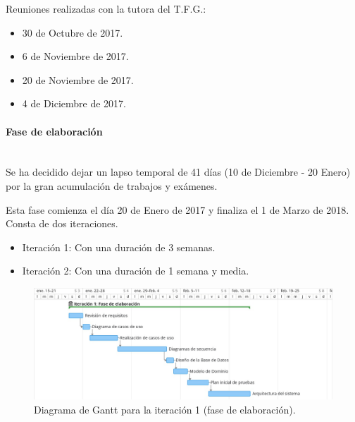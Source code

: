 \documentclass[twoside]{report}
\begin{document}
Reuniones realizadas con la tutora del T.F.G.:

\begin{itemize}
\item 30 de Octubre de 2017.
\item 6 de Noviembre de 2017.
\item 20 de Noviembre de 2017.
\item 4 de Diciembre de 2017.
\end{itemize}


\paragraph{Fase de elaboración}\mbox{}\\

Se ha decidido dejar un lapso temporal de 41 días (10 de Diciembre - 20 Enero) por la gran acumulación de trabajos y exámenes.

Esta fase comienza el día 20 de Enero de 2017 y finaliza el 1 de Marzo de 2018. Consta de dos iteraciones.

\begin{itemize}
\item Iteración 1: Con una duración de 3 semanas.
\item Iteración 2: Con una duración de 1 semana y media.
\end{itemize}

\begin{figure}[H]
\begin{center}
\includegraphics[width=\textwidth]{images/gantt/ite1}
\caption{Diagrama de Gantt para la iteración 1 (fase de elaboración).}
\end{center}
\end{figure}
\end{document}
